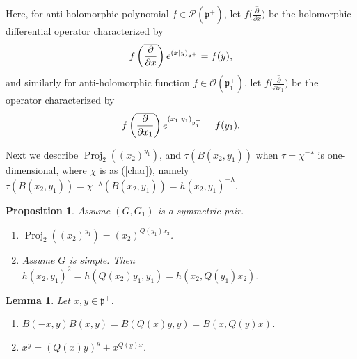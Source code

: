 \documentclass[11pt]{article}
\numberwithin{equation}{section}
\newtheorem{Lemma}[Theorem]{Lemma}
\newtheorem{Proposition}[Theorem]{Proposition}
{ \theoremstyle{definition}
\newtheorem{Definition}[Theorem]{Definition}
\newtheorem{Note}[Theorem]{Note}
\newtheorem{Example}[Theorem]{Example}
\newtheorem{Remark}[Theorem]{Remark} }
\newcommand{\fp}{\mathfrak{p}}
\newcommand{\cO}{\mathcal{O}}
\newcommand{\cP}{\mathcal{P}}
\newcommand{\Proj}{\operatorname{Proj}}
\begin{document}
Here, for anti-holomorphic polynomial $f\in\cP(\overline{\fp^+})$, let $f\big(\overline{\frac{\partial}{\partial x}}\big)$ be the
holomorphic differential operator characterized by
\begin{gather*} f\left(\overline{\frac{\partial}{\partial x}}\right){\rm e}^{(x|y)_{\fp^+}}=f(y), \end{gather*}
and similarly for anti-holomorphic function $f\in\cO(\overline{\fp^+_1})$, let $f\big(\overline{\frac{\partial}{\partial x_1}}\big)$ be the
operator characterized by
\begin{gather*} f\left(\overline{\frac{\partial}{\partial x_1}}\right){\rm e}^{(x_1|y_1)_{\fp^+_1}}=f(y_1). \end{gather*}

Next we describe $\Proj_2((x_2)^{y_1})$, and $\tau(B(x_2,y_1))$ when $\tau=\chi^{-\lambda}$ is one-dimensional, where $\chi$ is as (\ref{char}),
namely $\tau(B(x_2,y_1))=\chi^{-\lambda}(B(x_2,y_1))=h(x_2,y_1)^{-\lambda}$.
\begin{Proposition}\label{projprop}
Assume $(G,G_1)$ is a symmetric pair.
\begin{enumerate}\itemsep=0pt
\item[$(1)$] $\Proj_2((x_2)^{y_1})=(x_2)^{Q(y_1)x_2}$.
\item[$(2)$] Assume $G$ is simple. Then $h(x_2,y_1)^2=h(Q(x_2)y_1,y_1)=h(x_2,Q(y_1)x_2)$.
\end{enumerate}
\end{Proposition}
\begin{Lemma}\label{projlemma}
Let $x,y\in\fp^+$.
\begin{enumerate}\itemsep=0pt
\item[$(1)$] $B(-x,y)B(x,y)=B(Q(x)y,y)=B(x,Q(y)x)$.
\item[$(2)$] $x^y=(Q(x)y)^y+x^{Q(y)x}$.
\end{enumerate}
\end{Lemma}
\end{document}
